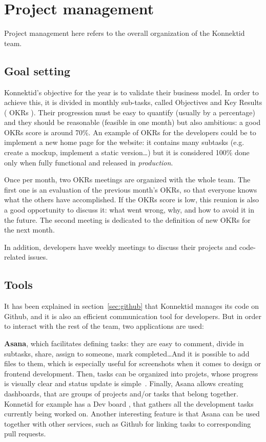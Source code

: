 \section{Project management}
\label{sec:management}

Project management here refers to the overall organization of the Konnektid team.

\subsection{Goal setting}
\label{ssec:goalSetting}

Konnektid's objective for the year is to validate their business model. In order to achieve this, it is divided in monthly sub-tasks, called Objectives and Key Results (\guillemotleft{} OKRs \guillemotright{}). Their progression must be easy to quantify (usually by a percentage) and they should be reasonable (feasible in one month) but also ambitious: a good OKRs score is around 70\%. An example of OKRs for the developers could be to implement a new home page for the website: it contains many subtasks (e.g. create a mockup, implement a static version\ldots) but it is considered 100\% done only when fully functional and released in \textit{production}.

Once per month, two OKRs meetings are organized with the whole team. The first one is an evaluation of the previous month's OKRs, so that everyone knows what the others have accomplished. If the OKRs score is low, this reunion is also a good opportunity to discuss it: what went wrong, why, and how to avoid it in the future. The second meeting is dedicated to the definition of new OKRs for the next month.

In addition, developers have weekly meetings to discuss their projects and code-related issues.

\subsection{Tools}
\label{ssec:tools}

It has been explained in {\sc section}~\ref{sec:github} that Konnektid manages its code on Github, and it is also an efficient communication tool for developers. But in order to interact with the rest of the team, two applications are used:

\textbf{Asana}, which facilitates defining tasks: they are easy to comment, divide in subtasks, share, assign to someone, mark completed\ldots And it is possible to add files to them, which is especially useful for screenshots when it comes to design or frontend development. Then, tasks can be organized into projets, whose progress is visually clear and status update is simple~\cite{asana}. Finally, Asana allows creating dashboards, that are groups of projects and/or tasks that belong together. Konnetid for example has a \guillemotleft{} Dev board \guillemotright{}, that gathers all the development tasks currently being worked on. Another interesting feature is that Asana can be used together with other services, such as Github for linking tasks to corresponding pull requests.

